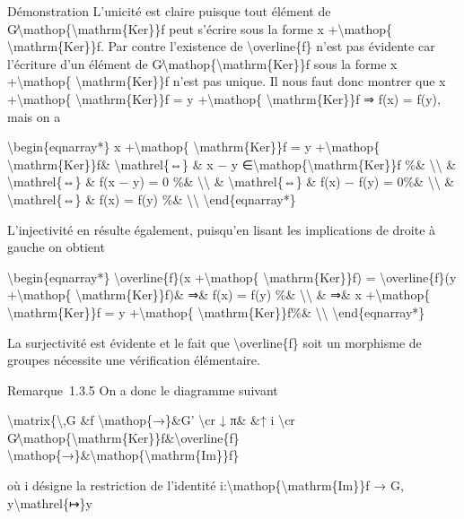 \documentclass[]{article}
\begin{document}
Démonstration L'unicité est claire puisque tout élément de
G∕\textbackslash{}mathop\{\textbackslash{}mathrm\{Ker\}\}f peut s'écrire
sous la forme x +\textbackslash{}mathop\{
\textbackslash{}mathrm\{Ker\}\}f. Par contre l'existence de
\textbackslash{}overline\{f\} n'est pas évidente car l'écriture d'un
élément de G∕\textbackslash{}mathop\{\textbackslash{}mathrm\{Ker\}\}f
sous la forme x +\textbackslash{}mathop\{
\textbackslash{}mathrm\{Ker\}\}f n'est pas unique. Il nous faut donc
montrer que x +\textbackslash{}mathop\{ \textbackslash{}mathrm\{Ker\}\}f
= y +\textbackslash{}mathop\{ \textbackslash{}mathrm\{Ker\}\}f ⇒ f(x) =
f(y), mais on a

\textbackslash{}begin\{eqnarray*\} x +\textbackslash{}mathop\{
\textbackslash{}mathrm\{Ker\}\}f = y +\textbackslash{}mathop\{
\textbackslash{}mathrm\{Ker\}\}f\& \textbackslash{}mathrel\{⇔\} \& x − y
∈\textbackslash{}mathop\{\textbackslash{}mathrm\{Ker\}\}f \%\&
\textbackslash{}\textbackslash{} \& \textbackslash{}mathrel\{⇔\} \& f(x
− y) = 0 \%\& \textbackslash{}\textbackslash{} \&
\textbackslash{}mathrel\{⇔\} \& f(x) − f(y) = 0\%\&
\textbackslash{}\textbackslash{} \& \textbackslash{}mathrel\{⇔\} \& f(x)
= f(y) \%\& \textbackslash{}\textbackslash{}
\textbackslash{}end\{eqnarray*\}

L'injectivité en résulte également, puisqu'en lisant les implications de
droite à gauche on obtient

\textbackslash{}begin\{eqnarray*\} \textbackslash{}overline\{f\}(x
+\textbackslash{}mathop\{ \textbackslash{}mathrm\{Ker\}\}f) =
\textbackslash{}overline\{f\}(y +\textbackslash{}mathop\{
\textbackslash{}mathrm\{Ker\}\}f)\& ⇒\& f(x) = f(y) \%\&
\textbackslash{}\textbackslash{} \& ⇒\& x +\textbackslash{}mathop\{
\textbackslash{}mathrm\{Ker\}\}f = y +\textbackslash{}mathop\{
\textbackslash{}mathrm\{Ker\}\}f\%\& \textbackslash{}\textbackslash{}
\textbackslash{}end\{eqnarray*\}

La surjectivité est évidente et le fait que
\textbackslash{}overline\{f\} soit un morphisme de groupes nécessite une
vérification élémentaire.

Remarque~1.3.5 On a donc le diagramme suivant

\textbackslash{}matrix\{\textbackslash{},G \&f
\textbackslash{}mathop\{→\}\&G' \textbackslash{}cr ↓ π\& \&↑ i
\textbackslash{}cr
G∕\textbackslash{}mathop\{\textbackslash{}mathrm\{Ker\}\}f\&\textbackslash{}overline\{f\}
\textbackslash{}mathop\{→\}\&\textbackslash{}mathop\{\textbackslash{}mathrm\{Im\}\}f\}

où i désigne la restriction de l'identité
i:\textbackslash{}mathop\{\textbackslash{}mathrm\{Im\}\}f → G,
y\textbackslash{}mathrel\{↦\}y
\end{document}
